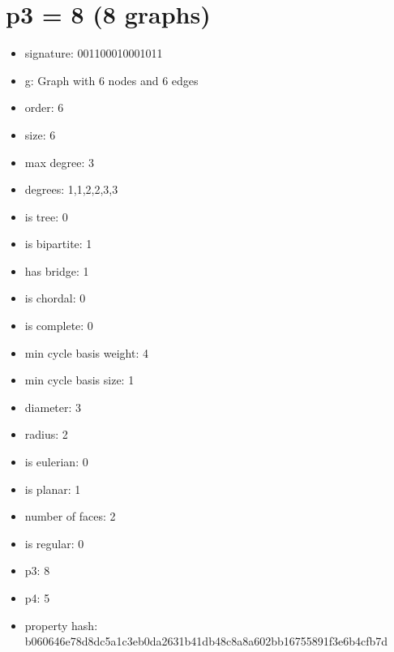 \chapter{p3 = 8 (8 graphs)}
\newpage\begin{figure}
\end{figure}
\begin{itemize}
\item signature: 001100010001011
\item g: Graph with 6 nodes and 6 edges
\item order: 6
\item size: 6
\item max degree: 3
\item degrees: 1,1,2,2,3,3
\item is tree: 0
\item is bipartite: 1
\item has bridge: 1
\item is chordal: 0
\item is complete: 0
\item min cycle basis weight: 4
\item min cycle basis size: 1
\item diameter: 3
\item radius: 2
\item is eulerian: 0
\item is planar: 1
\item number of faces: 2
\item is regular: 0
\item p3: 8
\item p4: 5
\item property hash: b060646e78d8dc5a1c3eb0da2631b41db48c8a8a602bb16755891f3e6b4cfb7d
\end{itemize}
\newpage
\begin{figure}
\end{figure}
